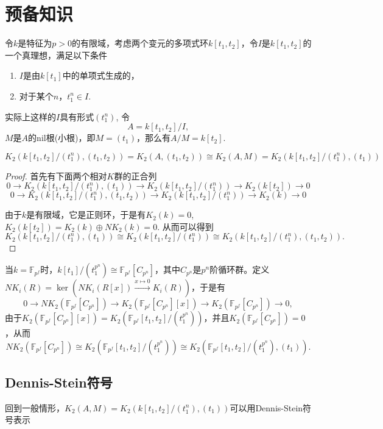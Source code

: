 \section{预备知识}
令$k$是特征为$p>0$的有限域，考虑两个变元的多项式环$k[t_1,t_2]$，令$I$是$k[t_1,t_2]$的一个真理想，满足以下条件
\begin{enumerate}
	\item $I$是由$k[t_1]$中的单项式生成的，
	\item 对于某个$n$，$t_1^n\in I$. 
\end{enumerate}

实际上这样的$I$具有形式$(t_1^n)$,
令
\[A=k[t_1,t_2]/I,\]
$M$是$A$的nil根(小根)，即$M=(t_1)$，那么有$A/M=k[t_2]$.
\begin{prop}
	$K_2(k[t_1,t_2]/(t_1^n),(t_1,t_2))=K_2(A,(t_1,t_2))\cong K_2(A,M)=K_2(k[t_1,t_2]/(t_1^n),(t_1))$
\end{prop}
\begin{proof}
	首先有下面两个相对$K$群的正合列
	\[
	0\longrightarrow K_2(k[t_1,t_2]/(t_1^n),(t_1)) \longrightarrow K_2(k[t_1,t_2]/(t_1^n)) \longrightarrow K_2(k[t_2]) \longrightarrow 0
	\]
	\[
	0\longrightarrow K_2(k[t_1,t_2]/(t_1^n),(t_1,t_2)) \longrightarrow K_2(k[t_1,t_2]/(t_1^n)) \longrightarrow K_2(k) \longrightarrow 0
	\]

	由于$k$是有限域，它是正则环，于是有$K_2(k)=0$, $K_2(k[t_2])=K_2(k)\oplus NK_2(k)=0$. 从而可以得到
	\[K_2(k[t_1,t_2]/(t_1^n),(t_1))\cong K_2(k[t_1,t_2]/(t_1^n)) \cong K_2(k[t_1,t_2]/(t_1^n),(t_1,t_2)).\]
\end{proof}

当$k=\mathbb{F}_{p^f}$时，$k[t_1]/(t_1^{p^n})\cong \mathbb{F}_{p^f}[C_{p^n}]$，其中$C_{p^n}$是$p^n$阶循环群。定义$NK_i(R)=\ker(NK_i(R[x])\overset{x\mapsto 0}\longrightarrow K_i(R))$，于是有
\[0\longrightarrow NK_2(\mathbb{F}_{p^f}[C_{p^n}]) \longrightarrow K_2(\mathbb{F}_{p^f}[C_{p^n}][x])\longrightarrow K_2(\mathbb{F}_{p^f}[C_{p^n}]) \longrightarrow 0,\]
由于$K_2(\mathbb{F}_{p^f}[C_{p^n}][x])=K_2(\mathbb{F}_{p^f}[t_1,t_2]/(t_1^{p^n}))$，并且$K_2(\mathbb{F}_{p^f}[C_{p^n}])=0$，从而
\[NK_2(\mathbb{F}_{p^f}[C_{p^n}])\cong K_2(\mathbb{F}_{p^f}[t_1,t_2]/(t_1^{p^n})) \cong K_2(\mathbb{F}_{p^f}[t_1,t_2]/(t_1^{p^n}),(t_1)).\]


\subsection{Dennis-Stein符号}
\label{sub:dennis_stein_symbols}
回到一般情形，$K_2(A,M)=K_2(k[t_1,t_2]/(t_1^n),(t_1))$可以用Dennis-Stein符号表示

